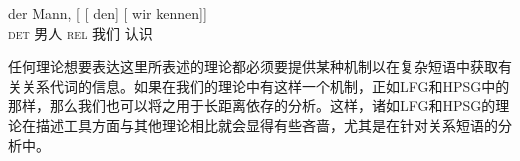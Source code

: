 \ea
\gll der Mann, [ [ den] [ wir kennen]]\\
	 \textsc{det} 男人 {} {} \textsc{rel} {} 我们 认识\\
\z
\begin{sloppypar}
\noindent
任何理论想要表达这里所表述的理论都必须要提供某种机制以在复杂短语中获取有关关系代词的信息。如果在我们的理论中有这样一个机制，正如LFG和HPSG中的那样\indexlfgc，那么我们也可以将之用于长距离依存的分析。这样，诸如LFG和HPSG的理论在描述工具方面与其他理论相比就会显得有些吝啬，尤其是在针对关系短语的分析中。
\end{sloppypar}

